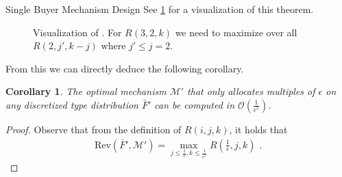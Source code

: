 \documentclass[11pt,a4paper]{article}
\newtheorem{corollary}[theorem]{Corollary}
\newcommand{\1}[1]{\mbox{\rm\bf 1}_{#1}}
\newcommand{\eqdot}{\text{ .}}
\begin{document}
\begin{section}{Single Buyer Mechanism Design}
 See \cref{fig:fptas-recursion-formular} for a visualization of this theorem.

 \begin{figure}[htp!]
     \centering
     \caption{
         Visualization of . For $R(3,2,k)$ we need to maximize over all $R(2, j', k-j)$ where $j' \leq j = 2$.
     }
     \label{fig:fptas-recursion-formular}
 \end{figure}

 From this we can directly deduce the following corollary.

 \begin{corollary}
     The optimal mechanism $\mathcal{M}'$ that only allocates multiples of $\epsilon$ on any discretized type distribution $\bar{F}'$
     can be computed in $\mathcal{O}\left(\frac{1}{\epsilon^5}\right)$.
 \end{corollary}
 \begin{proof}
     Observe that from the definition of $R(i,j,k)$, it holds that
     \begin{align*}
         \mathrm{Rev}(\bar{F}', \mathcal{M}') = \max_{j \leq \frac{1}{\epsilon}, k \leq \frac{1}{\epsilon^2}} R\left(\frac{1}{\epsilon}, j, k\right) \eqdot
     \end{align*}


\end{proof}
\end{section}
\end{document}
